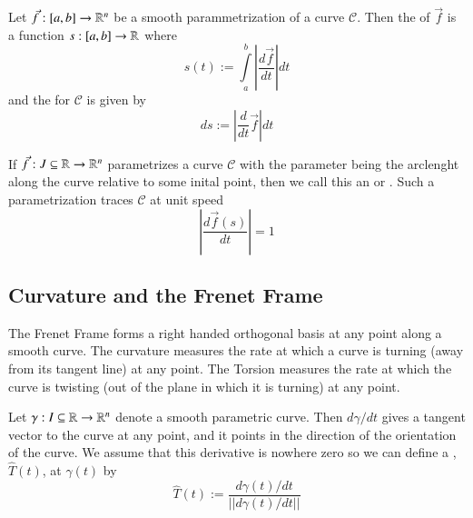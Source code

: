 \documentclass[12pt, a4paper, oneside, openright, titlepage]{book}
\begin{document}
\begin{appendices}
    \begin{defn}
        Let $\vec{f}:[a,b] \rightarrow \mathbb R^n$ be a smooth parammetrization of a curve $\mathscr{C}$. Then the  of $\vec{f}$ is a function $s:[a,b] \rightarrow \mathbb R$ where \begin{equation}
            s(t) := \int\limits_a^b\left|\frac{d\vec{f}}{dt}\right|dt
        \end{equation}
        and the  for $\mathscr{C}$ is given by \begin{equation}
            ds := \left|\frac{d}{dt}\vec{f}\right|dt
        \end{equation}
    \end{defn}

    \begin{defn}
        If $\vec{f}:J\subseteq \mathbb R\rightarrow \mathbb R^n$ parametrizes a curve $\mathscr{C}$ with the parameter being the arclenght along the curve relative to some inital point, then we call this an  or . Such a parametrization traces $\mathscr{C}$ at unit speed \begin{equation}
            \left|\frac{d\vec{f}(s)}{dt}\right| = 1
        \end{equation}
    \end{defn}
    

    

    \subsection{Curvature and the Frenet Frame}

    The Frenet Frame forms a right handed orthogonal basis at any point along a smooth curve.  The curvature measures the rate at which a curve is turning (away from its tangent line) at any point. The Torsion measures the rate at which the curve is twisting (out of the plane in which it is turning) at any point.

    \begin{defn}
        Let $\gamma:I\subseteq \mathbb R\rightarrow \mathbb R^n$ denote a smooth parametric curve. Then $d\gamma/dt$ gives a tangent vector to the curve at any point, and it points in the direction of the orientation of the curve. We assume that this derivative is nowhere zero so we can define a , $\hat{T}(t)$, at $\gamma(t)$ by \begin{equation*}
            \hat{T}(t) := \frac{d\gamma(t)/dt}{||d\gamma(t)/dt||}
        \end{equation*}
    \end{defn}
    

\end{appendices}
\end{document}
